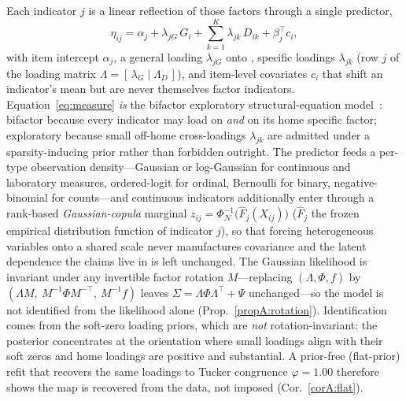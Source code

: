 Each indicator $j$ is a linear reflection of those factors through a single predictor,
\begin{equation}
  \eta_{ij}=\alpha_j+\lambda_{jG}\,G_i+\sum_{k=1}^{K}\lambda_{jk}\,D_{ik}+\beta_j^{\top}c_i ,
  \label{eq:measure}
\end{equation}
with item intercept $\alpha_j$, a general loading $\lambda_{jG}$ onto \Gfac{}, specific
loadings $\lambda_{jk}$ (row $j$ of the loading matrix
$\Lambda=[\,\lambda_G\mid\Lambda_D\,]$), and item-level covariates $c_i$ that shift an
indicator's mean but are never themselves factor indicators. Equation~\eqref{eq:measure}
\emph{is} the bifactor exploratory structural-equation
model~\citep{reise2012bifactor,asparouhov2009esem}: bifactor because every indicator may
load on \Gfac{} \emph{and} on its home specific factor; exploratory because small
off-home cross-loadings $\lambda_{jk}$ are admitted under a sparsity-inducing prior
rather than forbidden outright. The predictor feeds a per-type observation density---Gaussian
or log-Gaussian for continuous and laboratory measures, ordered-logit for ordinal,
Bernoulli for binary, negative-binomial for counts---and continuous indicators
additionally enter through a rank-based \emph{Gaussian-copula} marginal
$z_{ij}=\Phi_{\mathcal N}^{-1}\!\big(\hat F_j(X_{ij})\big)$ ($\hat F_j$ the frozen empirical
distribution function of indicator $j$), so that forcing heterogeneous variables onto a
shared scale never manufactures covariance and the latent dependence the claims live in is
left unchanged. The Gaussian likelihood is invariant under any invertible factor rotation
$M$---replacing $(\Lambda,\Phi,f)$ by $(\Lambda M,\ M^{-1}\Phi M^{-\top},\ M^{-1}f)$ leaves
$\Sigma=\Lambda\Phi\Lambda^{\top}+\Psi$ unchanged---so the model is not identified from the
likelihood alone (Prop.~\ref{propA:rotation}). Identification comes from the soft-zero
loading priors, which are \emph{not} rotation-invariant: the posterior concentrates at the
orientation where small loadings align with their soft zeros and home loadings are positive
and substantial. A prior-free (flat-prior) refit that recovers the same loadings to Tucker
congruence $\varphi=1.00$ therefore shows the map is recovered from the data, not imposed
(Cor.~\ref{corA:flat}).

